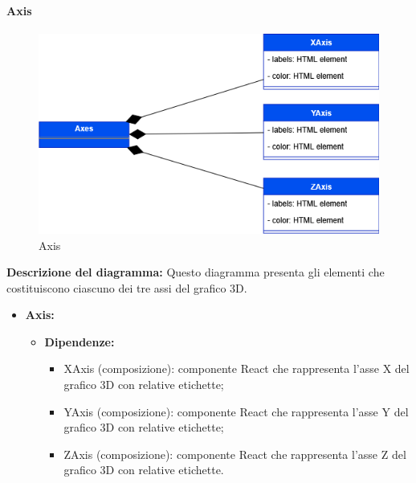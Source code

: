 \paragraph{Axis}
\begin{figure}[h!] \centering
    \includegraphics[scale=0.45]{template/images/uml_front/ui/axes.png}
    \caption{Axis}
\end{figure}
\textbf{Descrizione del diagramma:}
Questo diagramma presenta gli elementi che costituiscono ciascuno dei tre assi del grafico 3D.
\begin{itemize}
    \item \textbf{Axis:}
    \begin{itemize}
        \item \textbf{Dipendenze:}
        \begin{itemize}
            \item XAxis (composizione): componente React che rappresenta l'asse X del grafico 3D con relative etichette;
            \item YAxis (composizione): componente React che rappresenta l'asse Y del grafico 3D con relative etichette;
            \item ZAxis (composizione): componente React che rappresenta l'asse Z del grafico 3D con relative etichette.
        \end{itemize} 
    \end{itemize}
\end{itemize}